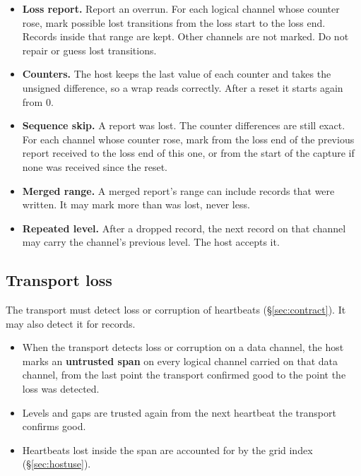 \documentclass[11pt,a4paper]{article}
\newcommand{\sref}[1]{\S\ref{#1}}
\begin{document}
\begin{itemize}
  \item \textbf{Loss report.} Report an overrun. For each logical channel whose counter
        rose, mark possible lost transitions from the loss start to the loss end.
        Records inside that range are kept. Other channels are not marked. Do not
        repair or guess lost transitions.
  \item \textbf{Counters.} The host keeps the last value of each counter and takes the
        unsigned difference, so a wrap reads correctly. After a reset it starts again
        from 0.
  \item \textbf{Sequence skip.} A report was lost. The counter differences are still
        exact. For each channel whose counter rose, mark from the loss end of the
        previous report received to the loss end of this one, or from the start of the
        capture if none was received since the reset.
  \item \textbf{Merged range.} A merged report's range can include records that were
        written. It may mark more than was lost, never less.
  \item \textbf{Repeated level.} After a dropped record, the next record on that
        channel may carry the channel's previous level. The host accepts it.
\end{itemize}

\subsection{Transport loss}\label{sec:transportloss}

The transport must detect loss or corruption of heartbeats (\sref{sec:contract}). It
may also detect it for records.

\begin{itemize}
  \item When the transport detects loss or corruption on a data channel, the host marks
        an \textbf{untrusted span} on every logical channel carried on that data
        channel, from the last point the transport confirmed good to the point the loss
        was detected.
  \item Levels and gaps are trusted again from the next heartbeat the transport
        confirms good.
  \item Heartbeats lost inside the span are accounted for by the grid index
        (\sref{sec:hostuse}).
\end{itemize}
\end{document}

